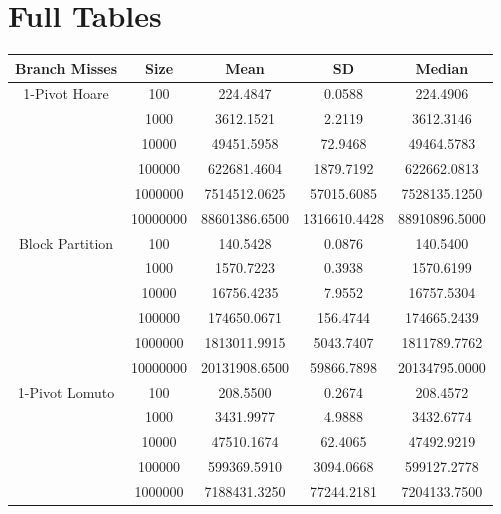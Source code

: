\documentclass[a4paper,oneside,12pt]{book}
\begin{document}
\section{Full Tables}
\hypertarget{FullTables}{}
\begin{center}
    \small
    \begin{tabular}{ |c c | c c c| }
        \hline
        Branch Misses   & Size     & Mean           & SD            & Median \\
        \hline
        1-Pivot Hoare   & 100      & 224.4847       & 0.0588        & 224.4906 \\
                        & 1000     & 3612.1521      & 2.2119        & 3612.3146 \\
                        & 10000    & 49451.5958     & 72.9468       & 49464.5783 \\
                        & 100000   & 622681.4604    & 1879.7192     & 622662.0813 \\
                        & 1000000  & 7514512.0625   & 57015.6085    & 7528135.1250 \\
                        & 10000000 & 88601386.6500  & 1316610.4428  & 88910896.5000 \\
        Block Partition & 100      & 140.5428       & 0.0876        & 140.5400 \\
                        & 1000     & 1570.7223      & 0.3938        & 1570.6199 \\
                        & 10000    & 16756.4235     & 7.9552        & 16757.5304 \\
                        & 100000   & 174650.0671    & 156.4744      & 174665.2439 \\
                        & 1000000  & 1813011.9915   & 5043.7407     & 1811789.7762 \\
                        & 10000000 & 20131908.6500  & 59866.7898    & 20134795.0000 \\
        \hline
        1-Pivot Lomuto  & 100      & 208.5500       & 0.2674        & 208.4572 \\
                        & 1000     & 3431.9977      & 4.9888        & 3432.6774 \\
                        & 10000    & 47510.1674     & 62.4065       & 47492.9219 \\
                        & 100000   & 599369.5910    & 3094.0668     & 599127.2778 \\
                        & 1000000  & 7188431.3250   & 77244.2181    & 7204133.7500 \\

\end{tabular}
\end{center}
\end{document}
